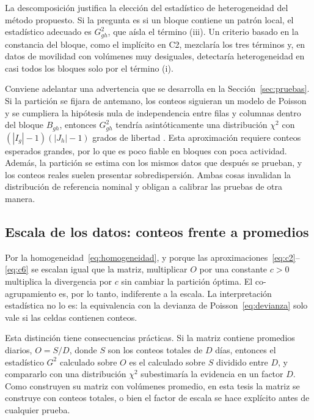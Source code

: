 La descomposición justifica la elección del estadístico de heterogeneidad del
método propuesto. Si la pregunta es si un bloque contiene un patrón local, el
estadístico adecuado es $G^2_{gh}$, que aísla el término (iii). Un criterio basado
en la constancia del bloque, como el implícito en C2, mezclaría los tres términos
y, en datos de movilidad con volúmenes muy desiguales, detectaría heterogeneidad
en casi todos los bloques solo por el término (i).

Conviene adelantar una advertencia que se desarrolla en la
Sección~\ref{sec:pruebas}. Si la partición se fijara de antemano, los
conteos siguieran un modelo de Poisson y se cumpliera la hipótesis nula de
independencia entre filas y columnas dentro del bloque $B_{gh}$, entonces
$G^2_{gh}$ tendría asintóticamente una distribución $\chi^2$ con
$(|I_g|-1)(|J_h|-1)$ grados de libertad \cite[Secs.~3.2.1 y~4.5.2]{Agresti2013}.
Esta aproximación requiere conteos esperados grandes, por lo que es poco fiable en
bloques con poca actividad. Además, la partición se estima con los mismos datos
que después se prueban, y los conteos reales suelen presentar sobredispersión.
Ambas cosas invalidan la distribución de referencia nominal y obligan a calibrar
las pruebas de otra manera.

\subsection{Escala de los datos: conteos frente a promedios}\label{sec:escala}

Por la homogeneidad~\eqref{eq:homogeneidad}, y porque las
aproximaciones~\eqref{eq:c2}--\eqref{eq:c6} se escalan igual que la matriz,
multiplicar $O$ por una constante $c > 0$ multiplica la divergencia por $c$ sin
cambiar la partición óptima. El co-agrupamiento es, por lo tanto, indiferente a la
escala. La interpretación estadística no lo es: la equivalencia con la devianza
de Poisson~\eqref{eq:devianza} solo vale si las celdas contienen conteos.

Esta distinción tiene consecuencias prácticas. Si la matriz contiene promedios
diarios, $O = S / D$, donde $S$ son los conteos totales de $D$ días, entonces el
estadístico $G^2$ calculado sobre $O$ es el calculado sobre $S$ dividido entre
$D$, y compararlo con una distribución $\chi^2$ subestimaría la evidencia en un
factor $D$. Como \cite{Liu2021} construyen su matriz con volúmenes promedio, en
esta tesis la matriz se construye con conteos totales, o bien el factor de escala
se hace explícito antes de cualquier prueba.

